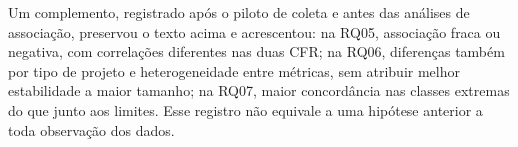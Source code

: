 Um complemento, registrado após o piloto de coleta e antes das análises de
associação, preservou o texto acima e acrescentou: na RQ05, associação fraca
ou negativa, com correlações diferentes nas duas CFR; na RQ06, diferenças
também por tipo de projeto e heterogeneidade entre métricas, sem atribuir
melhor estabilidade a maior tamanho; na RQ07, maior concordância nas classes
extremas do que junto aos limites. Esse registro não equivale a uma hipótese
anterior a toda observação dos dados.
